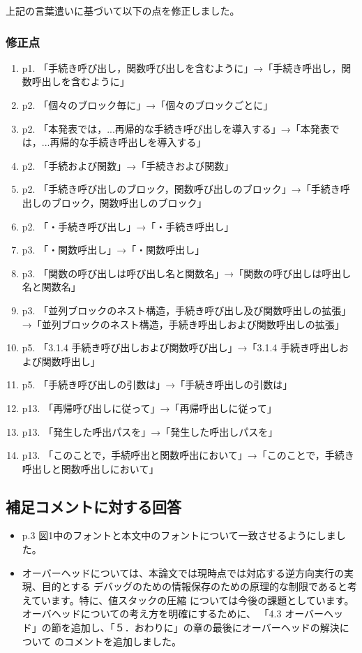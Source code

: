 \documentclass[a4j]{jarticle}
\begin{document}
上記の言葉遣いに基づいて以下の点を修正しました。
\subsubsection*{修正点}
\begin{enumerate}
\item p1. 「手続き呼び出し，関数呼び出しを含むように」→「手続き呼出し，関数呼出しを含むように」
\item p2. 「個々のブロック毎に」→「個々のブロックごとに」
\item p2. 「本発表では，...再帰的な手続き呼び出しを導入する」→「本発表では，...再帰的な手続き呼出しを導入する」
\item p2. 「手続および関数」→「手続きおよび関数」
\item p2. 「手続き呼び出しのブロック，関数呼び出しのブロック」→「手続き呼出しのブロック，関数呼出しのブロック」
\item p2. 「・手続き呼び出し」→「・手続き呼出し」
\item p3. 「・関数呼出し」→「・関数呼出し」
\item p3. 「関数の呼び出しは呼び出し名と関数名」→「関数の呼び出しは呼出し名と関数名」
\item p3. 「並列ブロックのネスト構造，手続き呼び出し及び関数呼出しの拡張」→「並列ブロックのネスト構造，手続き呼出しおよび関数呼出しの拡張」
\item p5. 「3.1.4  手続き呼び出しおよび関数呼び出し」→「3.1.4  手続き呼出しおよび関数呼出し」
\item p5. 「手続き呼び出しの引数は」→「手続き呼出しの引数は」
\item p13. 「再帰呼び出しに従って」→「再帰呼出しに従って」
\item p13. 「発生した呼出パスを」→「発生した呼出しパスを」
\item p13. 「このことで，手続呼出と関数呼出において」→「このことで，手続き呼出しと関数呼出しにおいて」
\end{enumerate}

\subsection*{補足コメントに対する回答}
\begin{itemize}
\item p.3 図1中のフォントと本文中のフォントについて一致させるようにしました。
\item オーバーヘッドについては、本論文では現時点では対応する逆方向実行の実現、目的とする
デバッグのための情報保存のための原理的な制限であると考えています。特に、値スタックの圧縮
については今後の課題としています。オーバヘッドについての考え方を明確にするために、
「4.3 オーバーヘッド」の節を追加し、「５．おわりに」の章の最後にオーバーヘッドの解決について
のコメントを追加しました。
\end{itemize}
\end{document}
